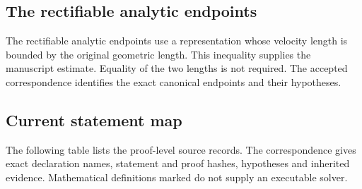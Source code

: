 \subsection{The rectifiable analytic endpoints}

The rectifiable analytic endpoints use a representation whose velocity length is bounded by the original geometric length. This inequality supplies the manuscript estimate. Equality of the two lengths is not required. The accepted correspondence identifies the exact canonical endpoints and their hypotheses.

\subsection{Current statement map}

The following table lists the proof-level source records. The correspondence gives exact declaration names, statement and proof hashes, hypotheses and inherited evidence. Mathematical definitions marked  do not supply an executable solver.

